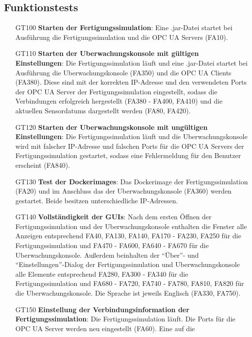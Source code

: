 \documentclass[parskip=full]{scrartcl}
\begin{document}
\subsection{Funktionstests}
\begin{enumerate}
  \item[GT100] \textbf{Starten der \gls{Fertigungssimulation}}: Eine .jar-Datei startet bei Ausführung die \gls{Fertigungssimulation} und die \glspl{OPC UA Server} (FA10).
  \item[GT110] \textbf{Starten der \gls{Uberwachungskonsole} mit gültigen Einstellungen}: Die \gls{Fertigungssimulation} läuft und eine .jar-Datei startet
   bei Ausführung die \gls{Uberwachungskonsole} (FA350) und die \glspl{OPC UA Client} (FA380). Diese sind mit der korrekten IP-Adresse und den verwendeten Ports der \gls{OPC UA Server}
   der \gls{Fertigungssimulation} eingestellt, sodass die Verbindungen erfolgreich hergestellt (FA380 - FA400, FA410) und die aktuellen \glspl{Sensordatum}
   dargestellt werden (FA80, FA420).
  \item[GT120] \textbf{Starten der \gls{Uberwachungskonsole} mit ungültigen Einstellungen}: Die \gls{Fertigungssimulation} läuft und die \gls{Uberwachungskonsole} wird mit falscher
   IP-Adresse und falschen Ports für die \glspl{OPC UA Server} der \gls{Fertigungssimulation} gestartet, sodass eine Fehlermeldung für den Benutzer erscheint (FA840).
  \item[GT130] \textbf{Test der \glspl{Dockerimage}}: Das \gls{Dockerimage} der \gls{Fertigungssimulation} (FA20) und im Anschluss das der \gls{Uberwachungskonsole} (FA360) werden gestartet. Beide besitzen unterschiedliche IP-Adressen.
  \item[GT140] \textbf{Vollständigkeit der \glspl{GUI}}: Nach dem ersten Öffnen der \gls{Fertigungssimulation} und der \gls{Uberwachungskonsole} enthalten die Fenster alle Anzeigen
   entsprechend FA40, FA130, FA140, FA170 - FA230, FA250 für die \gls{Fertigungssimulation} und
   FA470 - FA600, FA640 - FA670 für die \gls{Uberwachungskonsole}.
   Außerdem beinhalten der "`Über"'- und "`Einstellungen"'-Dialog der \gls{Fertigungssimulation} und \gls{Uberwachungskonsole} alle Elemente entsprechend
   FA280, FA300 - FA340 für die \gls{Fertigungssimulation} und FA680 - FA720, FA740 - FA780, FA810, FA820 für die \gls{Uberwachungskonsole}.
   Die Sprache ist jeweils Englisch (FA330, FA750).
  \item[GT150] \textbf{Einstellung der \gls{Verbindungsinformation} der \gls{Fertigungssimulation}}: Die \gls{Fertigungssimulation} läuft. Die Ports für die \gls{OPC UA Server} werden neu eingestellt (FA60). Eine auf die 

\end{enumerate}
\end{document}
